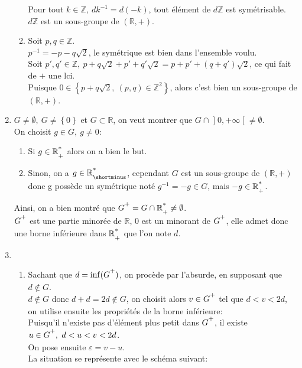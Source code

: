 \documentclass[article,11pt]{article}
\newcommand{\bgp}[1]{
    \left(#1\right)
}
\newcommand{\bgbr}[1]{
    \left\{#1\right\}
}
\begin{document}
\begin{enumerate}
\begin{enumerate}
Pour tout $k\in\mathbb{Z},\ dk^{-1}=d(-k)$, tout élément de $d\mathbb{Z}$ est symétrisable.\\[.3em]
$d\mathbb{Z}$ est un sous-groupe de $\bgp{\mathbb{R},+}$.
\item Soit $p,q\in\mathbb{Z}$.\\[.3em]
$p^{-1}=-p-q\sqrt{2}$, le symétrique est bien dans l'ensemble voulu.\\[.5em]
Soit $p',q'\in\mathbb{Z},\ p+q\sqrt{2}+p'+q'\sqrt{2}=p+p'+(q+q')\sqrt{2}$, ce qui fait de $+$ une lci.\\[.5em]
Puisque $0\in\bgbr{p+q\sqrt{2},\ (p,q)\in\mathbb{Z}^{2}}$, alors c'est bien un sous-groupe de $\bgp{\mathbb{R},+}$.
\end{enumerate}
\item$G\neq\emptyset,\ G\neq\bgbr{0}$ et $G\subset\mathbb{R}$, on veut montrer que $G\cap\mathopen]0,+\infty\mathclose[\neq\emptyset$.\\
On choisit $g\in G,\ g\neq 0$:
\begin{enumerate}[label=-]
\item Si $g\in\mathbb{R}\strut^{*}_{+}$ alors on a bien le but.
\item Sinon, on a $g\in\mathbb{R}\strut^{*}_{\shortminus}$, cependant $G$ est un sous-groupe de $\bgp{\mathbb{R},+}$ donc g possède un symétrique noté $g^{-1}=-g\in G$, mais $-g\in\mathbb{R}\strut^{*}_{+}$.
\end{enumerate}
Ainsi, on a bien montré que $G\strut^{+}=G\cap\mathbb{R}\strut^{\ast}_{+}\neq\emptyset$.\\[.3em]
$G\strut^{+}$ est une partie minorée de $\mathbb{R}$, $0$ est un minorant de $G\strut^{+}$, elle admet donc une borne inférieure dans $\mathbb{R}\strut^{*}_{+}$ que l'on note $d$.
\item\begin{enumerate}
\item Sachant que $d=\inf(G\strut^{+})$, on procède par l'absurde, en supposant que $d\notin G$.\\[.3em]
$d\notin G$ donc $d+d=2d\notin G$, on choisit alors $v\in G\strut^{+}$ tel que $d<v<2d$, on utilise ensuite les propriétés de la borne inférieure:\\[.3em]
Puisqu'il n'existe pas d'élément plus petit dans $G\strut^{+}$, il existe $u\in G\strut^{+},\ d<u<v<2d$.\\
On pose ensuite $\varepsilon=v-u$.\\
La situation se représente avec le schéma suivant:\vspace{.8em}

\end{enumerate}
\end{enumerate}
\end{document}
